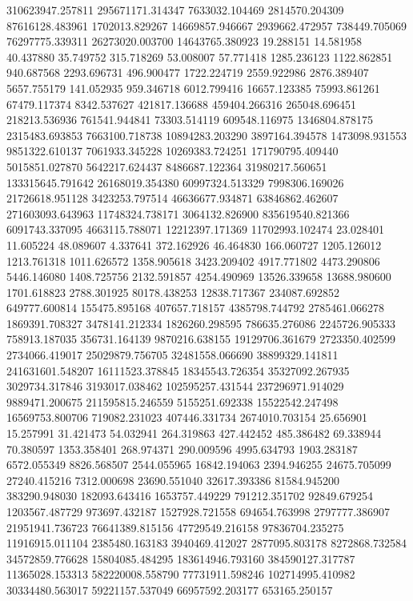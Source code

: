 310623947.257811
295671171.314347
7633032.104469
2814570.204309
87616128.483961
1702013.829267
14669857.946667
2939662.472957
738449.705069
76297775.339311
26273020.003700
14643765.380923
19.288151
14.581958
40.437880
35.749752
315.718269
53.008007
57.771418
1285.236123
1122.862851
940.687568
2293.696731
496.900477
1722.224719
2559.922986
2876.389407
5657.755179
141.052935
959.346718
6012.799416
16657.123385
75993.861261
67479.117374
8342.537627
421817.136688
459404.266316
265048.696451
218213.536936
761541.944841
73303.514119
609548.116975
1346804.878175
2315483.693853
7663100.718738
10894283.203290
3897164.394578
1473098.931553
9851322.610137
7061933.345228
10269383.724251
171790795.409440
5015851.027870
5642217.624437
8486687.122364
31980217.560651
133315645.791642
26168019.354380
60997324.513329
7998306.169026
21726618.951128
3423253.797514
46636677.934871
63846862.462607
271603093.643963
11748324.738171
3064132.826900
835619540.821366
6091743.337095
4663115.788071
12212397.171369
11702993.102474
23.028401
11.605224
48.089607
4.337641
372.162926
46.464830
166.060727
1205.126012
1213.761318
1011.626572
1358.905618
3423.209402
4917.771802
4473.290806
5446.146080
1408.725756
2132.591857
4254.490969
13526.339658
13688.980600
1701.618823
2788.301925
80178.438253
12838.717367
234087.692852
649777.600814
155475.895168
407657.718157
4385798.744792
2785461.066278
1869391.708327
3478141.212334
1826260.298595
786635.276086
2245726.905333
758913.187035
356731.164139
9870216.638155
19129706.361679
2723350.402599
2734066.419017
25029879.756705
32481558.066690
38899329.141811
241631601.548207
16111523.378845
18345543.726354
35327092.267935
3029734.317846
3193017.038462
102595257.431544
237296971.914029
9889471.200675
211595815.246559
5155251.692338
15522542.247498
16569753.800706
719082.231023
407446.331734
2674010.703154
25.656901
15.257991
31.421473
54.032941
264.319863
427.442452
485.386482
69.338944
70.380597
1353.358401
268.974371
290.009596
4995.634793
1903.283187
6572.055349
8826.568507
2544.055965
16842.194063
2394.946255
24675.705099
27240.415216
7312.000698
23690.551040
32617.393386
81584.945200
383290.948030
182093.643416
1653757.449229
791212.351702
92849.679254
1203567.487729
973697.432187
1527928.721558
694654.763998
2797777.386907
21951941.736723
76641389.815156
47729549.216158
97836704.235275
11916915.011104
2385480.163183
3940469.412027
2877095.803178
8272868.732584
34572859.776628
15804085.484295
183614946.793160
384590127.317787
11365028.153313
582220008.558790
77731911.598246
102714995.410982
30334480.563017
59221157.537049
66957592.203177
653165.250157
